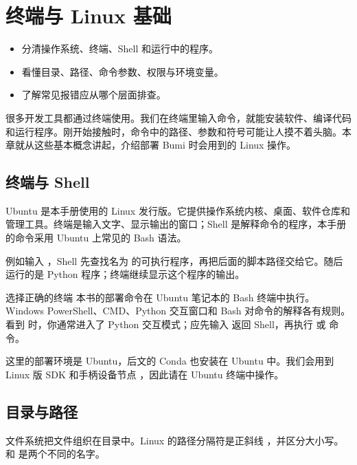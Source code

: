 \chapter{终端与 Linux 基础}
\label{chap:terminal}
\begin{intro}
\begin{itemize}
\item 分清操作系统、终端、Shell 和运行中的程序。
\item 看懂目录、路径、命令参数、权限与环境变量。
\item 了解常见报错应从哪个层面排查。
\end{itemize}
\end{intro}

很多开发工具都通过终端使用。我们在终端里输入命令，就能安装软件、编译代码和运行程序。刚开始接触时，命令中的路径、参数和符号可能让人摸不着头脑。本章就从这些基本概念讲起，介绍部署 Bumi 时会用到的 Linux 操作。

\section{终端与 Shell}
Ubuntu 是本手册使用的 Linux 发行版。它提供操作系统内核、桌面、软件仓库和管理工具。终端是输入文字、显示输出的窗口；Shell 是解释命令的程序，本手册的命令采用 Ubuntu 上常见的 Bash 语法。

例如输入 ，Shell 先查找名为  的可执行程序，再把后面的脚本路径交给它。随后运行的是 Python 程序；终端继续显示这个程序的输出。

\begin{concept}{选择正确的终端}
本书的部署命令在 Ubuntu 笔记本的 Bash 终端中执行。Windows PowerShell、CMD、Python 交互窗口和 Bash 对命令的解释各有规则。看到 \code{>>>} 时，你通常进入了 Python 交互模式；应先输入  返回 Shell，再执行  或  命令。
\end{concept}

这里的部署环境是 Ubuntu，后文的 Conda 也安装在 Ubuntu 中。我们会用到 Linux 版 SDK 和手柄设备节点 ，因此请在 Ubuntu 终端中操作。

\section{目录与路径}
文件系统把文件组织在目录中。Linux 的路径分隔符是正斜线 \code{/}，并区分大小写。 和  是两个不同的名字。

